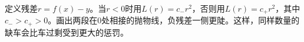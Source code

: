 定义残差\(r=f(x)-y\)。当\(r<0\)时用\(L(r)=c_-r^2\)，否则用\(L(r)=c_+r^2\)，其中\(c_->c_+>0\)。画出两段在0处相接的抛物线，负残差一侧更陡。这样，同样数量的缺车会比车过剩受到更大的惩罚。
